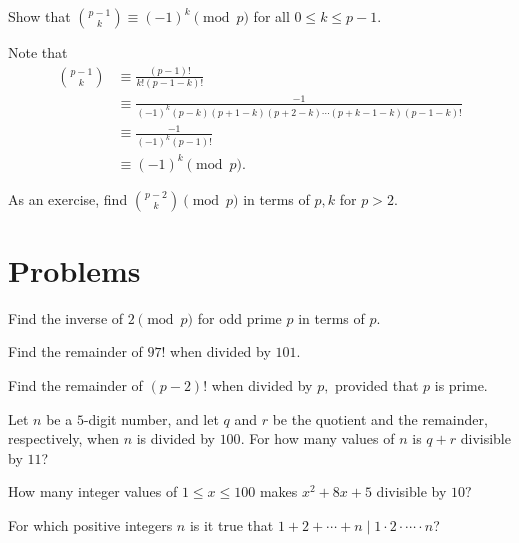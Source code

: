 \documentclass{article}
\begin{document}
\begin{exam}
Show that $\binom{p-1}{k}\equiv (-1)^k\pmod{p}$ for all $0\leq k\leq p-1.$
\end{exam}

\begin{sol}
Note that
\begin{align*}
\binom{p-1}{k}&\equiv \frac{(p-1)!}{k!(p-1-k)!}\\
&\equiv \frac{-1}{(-1)^{k}(p-k)(p+1-k)(p+2-k)\cdots(p+k-1-k)(p-1-k)!}\\
&\equiv \frac{-1}{(-1)^k(p-1)!}\\
&\equiv (-1)^k\pmod{p}.
\end{align*}
\end{sol}

As an exercise, find $\binom{p-2}{k}\pmod{p}$ in terms of $p,k$ for $p>2.$

\pagebreak

\section{Problems}


\begin{prob}[]{1}
Find the inverse of $2\pmod {p}$ for odd prime $p$ in terms of $p.$
\end{prob}
    
\begin{prob}[]{1}
Find the remainder of $97!$ when divided by $101.$
\end{prob}
    
\begin{prob}[]{1}
Find the remainder of $(p-2)!$ when divided by $p,$ provided that $p$ is prime.
\end{prob}
    
\begin{prob}[AMC 12A 2003/18]{2}
Let $n$ be a $5$-digit number, and let $q$ and $r$ be the quotient and the remainder, respectively, when $n$ is divided by $100$. For how many values of $n$ is $q+r$ divisible by $11$?
\end{prob}
    
\begin{prob}{2}
How many integer values of $1\leq x\leq 100$ makes $x^2+8x+5$ divisible by $10?$
\end{prob}
    
\begin{prob}{2}
For which positive integers $n$ is it true that $1+2+\cdots+n\mid 1\cdot 2\cdot \cdots \cdot n$?
\end{prob}
\end{document}
